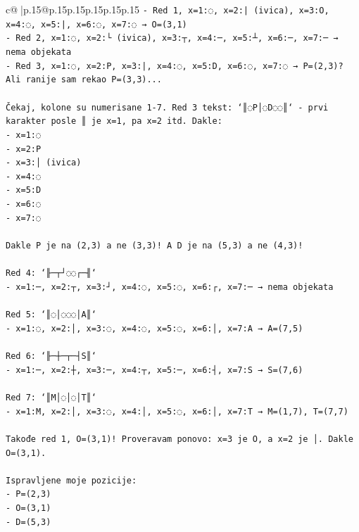 \documentclass{article}
\begin{document}
{\begin{supertabular}{c@{$\;$}|p{.15\linewidth}@{}p{.15\linewidth}p{.15\linewidth}p{.15\linewidth}p{.15\linewidth}p{.15\linewidth}}
{{{\texttt{{-} Red 1, x=1:◌, x=2:| (ivica), x=3:O, x=4:◌, x=5:|, x=6:◌, x=7:◌  → O=(3,1)} \\
\texttt{{-} Red 2, x=1:◌, x=2:└ (ivica), x=3:┬, x=4:─, x=5:┴, x=6:─, x=7:─ → nema objekata} \\
\texttt{{-} Red 3, x=1:◌, x=2:P, x=3:|, x=4:◌, x=5:D, x=6:◌, x=7:◌ → P=(2,3)? Ali ranije sam rekao P=(3,3)... } \\
\\ 
\texttt{Čekaj, kolone su numerisane 1{-}7. Red 3 tekst: `║◌P│◌D◌◌║` {-} prvi karakter posle ║ je x=1, pa x=2 itd. Dakle:} \\
\texttt{{-} x=1:◌} \\
\texttt{{-} x=2:P} \\
\texttt{{-} x=3:│ (ivica)} \\
\texttt{{-} x=4:◌} \\
\texttt{{-} x=5:D} \\
\texttt{{-} x=6:◌} \\
\texttt{{-} x=7:◌} \\
\\ 
\texttt{Dakle P je na (2,3) a ne (3,3)! A D je na (5,3) a ne (4,3)!} \\
\\ 
\texttt{Red 4: `╟─┬┘◌◌┌─╢`} \\
\texttt{{-} x=1:─, x=2:┬, x=3:┘, x=4:◌, x=5:◌, x=6:┌, x=7:─ → nema objekata} \\
\\ 
\texttt{Red 5: `║◌│◌◌◌│A║`} \\
\texttt{{-} x=1:◌, x=2:│, x=3:◌, x=4:◌, x=5:◌, x=6:│, x=7:A → A=(7,5)} \\
\\ 
\texttt{Red 6: `╟─┼─┬─┤S║`} \\
\texttt{{-} x=1:─, x=2:┼, x=3:─, x=4:┬, x=5:─, x=6:┤, x=7:S → S=(7,6)} \\
\\ 
\texttt{Red 7: `║M│◌│◌│T║`} \\
\texttt{{-} x=1:M, x=2:│, x=3:◌, x=4:│, x=5:◌, x=6:│, x=7:T → M=(1,7), T=(7,7)} \\
\\ 
\texttt{Takođe red 1, O=(3,1)! Proveravam ponovo: x=3 je O, a x=2 je │. Dakle O=(3,1).} \\
\\ 
\texttt{Ispravljene moje pozicije:} \\
\texttt{{-} P=(2,3)} \\
\texttt{{-} O=(3,1)} \\
\texttt{{-} D=(5,3)} \\
}}}
\end{supertabular}}
\end{document}
